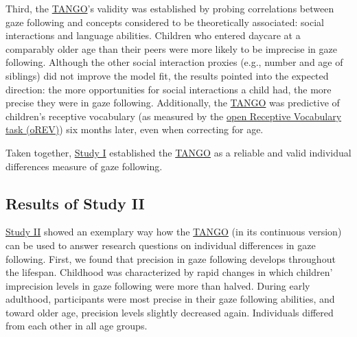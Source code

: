 \documentclass[
]{scrbook}
\begin{document}
Third, the \hyperref[acronyms_TANGO]{TANGO}'s validity was established by probing correlations between gaze following and concepts considered to be theoretically associated: social interactions and language abilities. Children who entered daycare at a comparably older age than their peers were more likely to be imprecise in gaze following. Although the other social interaction proxies (e.g., number and age of siblings) did not improve the model fit, the results pointed into the expected direction: the more opportunities for social interactions a child had, the more precise they were in gaze following. Additionally, the \hyperref[acronyms_TANGO]{TANGO} was predictive of children's receptive vocabulary (as measured by the \hyperref[acronyms_oREV]{open Receptive Vocabulary task (oREV)}) six months later, even when correcting for age.

Taken together, \hyperref[studyI]{Study I} established the \hyperref[acronyms_TANGO]{TANGO} as a reliable and valid individual differences measure of gaze following.

\subsection{Results of Study II}\label{resultsII}

\hyperref[studyII]{Study II} showed an exemplary way how the \hyperref[acronyms_TANGO]{TANGO} (in its continuous version) can be used to answer research questions on individual differences in gaze following. First, we found that precision in gaze following develops throughout the lifespan. Childhood was characterized by rapid changes in which children' imprecision levels in gaze following were more than halved. During early adulthood, participants were most precise in their gaze following abilities, and toward older age, precision levels slightly decreased again. Individuals differed from each other in all age groups.
\end{document}
